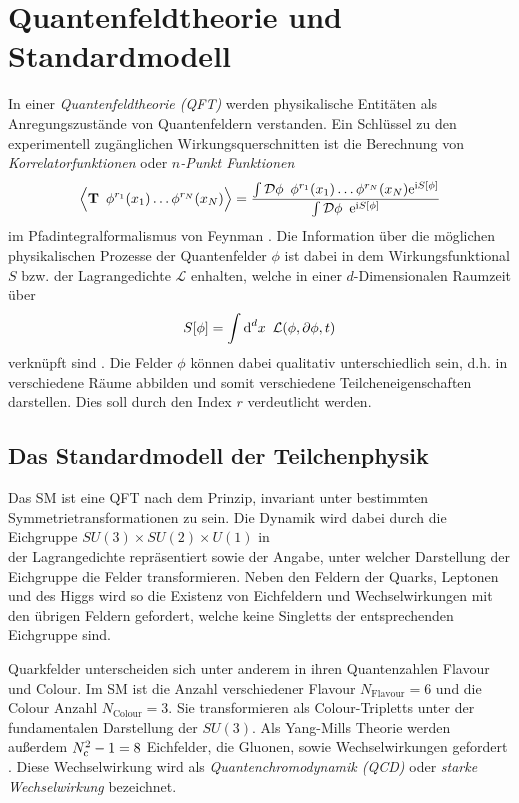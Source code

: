 \clearpage
\section{Quantenfeldtheorie und Standardmodell}
  In einer \textit{Quantenfeldtheorie (QFT)} werden physikalische Entitäten 
  als Anregungszustände von Quantenfeldern 
  verstanden. Ein Schlüssel zu den experimentell zugänglichen 
  Wirkungsquerschnitten ist die Berechnung von \textit{Korrelatorfunktionen} 
  oder \textit{$n$-Punkt Funktionen}
  \begin{equation}
   \Big\langle \textbf{T} \,\,\, \phi^{r_1}(x_1) \ldots \phi^{r_N}(x_N) 
   \Big\rangle
   =\frac{\int \mathcal{D}\phi \,\,\, \phi^{r_1}(x_1) \ldots \phi^{r_N}(x_N) 
   \text{e}^{\text{i} S[\phi]}}{\int \mathcal{D}\phi \,\,\, \text{e}^{\text{i} S[\phi]} }
   \label{renormierung:Korrelator_definition}
  \end{equation}
  im Pfadintegralformalismus von Feynman \cite{Schwartz}. Die Information über 
  die möglichen 
  physikalischen Prozesse der Quantenfelder $\phi$ 
  ist dabei in dem Wirkungsfunktional $S$ bzw. der Lagrangedichte $\mathcal{L}$ 
  enhalten, welche in einer $d$-Dimensionalen Raumzeit über 
  \begin{equation}
    S[\phi] = \int \text{d}^d x \,\,\, \mathcal{L}(\phi,\partial \phi, t) 
    \label{renormierung:Wirkung_definition}
  \end{equation}
  verknüpft sind \cite{Schwartz}. Die Felder $\phi$ können dabei qualitativ 
  unterschiedlich sein, d.h. in verschiedene Räume abbilden und somit 
  verschiedene Teilcheneigenschaften darstellen. Dies soll durch den Index 
  $r$ verdeutlicht werden.

  \subsection{Das Standardmodell der Teilchenphysik}
    Das SM ist eine QFT nach dem Prinzip, invariant unter bestimmten 
    Symmetrietransformationen zu sein. Die Dynamik wird dabei durch die 
    Eichgruppe $SU(3)\times SU(2)\times U(1)$ in \\der Lagrangedichte 
    repräsentiert sowie der Angabe, 
    unter welcher Darstellung der Eichgruppe die Felder transformieren. 
    Neben den Feldern der Quarks, Leptonen und des Higgs wird so die 
    Existenz von Eichfeldern und Wechselwirkungen mit den übrigen Feldern 
    gefordert, welche keine Singletts der entsprechenden Eichgruppe sind.

    Quarkfelder unterscheiden sich unter anderem in ihren Quantenzahlen 
    Flavour und Colour. Im SM ist die Anzahl verschiedener 
    Flavour $N_\text{Flavour}=6$ und die Colour Anzahl $N_\text{Colour} = 3$. 
    Sie transformieren als Colour-Tripletts unter der fundamentalen Darstellung 
    der $SU(3)$. Als Yang-Mills Theorie werden außerdem $N_\text{c}^2-1 = 8$ 
    Eichfelder, die Gluonen, sowie Wechselwirkungen gefordert \cite{Zinn}. 
    Diese Wechselwirkung wird  als \textit{Quantenchromodynamik (QCD)} oder 
    \textit{starke Wechselwirkung} bezeichnet.
    
